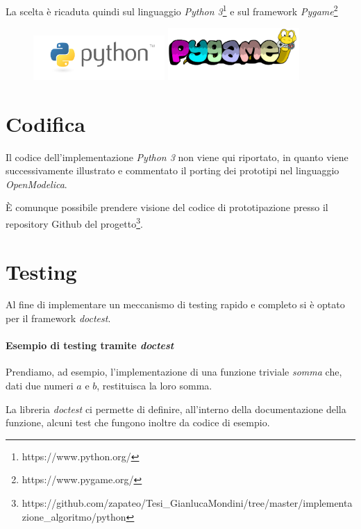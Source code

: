 \documentclass[11pt,a4paper]{report}
\begin{document}
La scelta è ricaduta quindi sul linguaggio \textit{Python 3}\footnote{https://www.python.org/} e sul framework \textit{Pygame}\footnote{https://www.pygame.org/}

\begin{figure}[H]
\centering
\includegraphics[width=5cm]{python.png}
\includegraphics[width=5cm]{pygame.png}

\end{figure}

\section{Codifica}

Il codice dell'implementazione \textit{Python 3} non viene qui riportato, in quanto viene successivamente illustrato e commentato il porting dei prototipi nel linguaggio \textit{OpenModelica}.

È comunque possibile prendere visione del codice di prototipazione presso il repository Github del progetto\footnote{https://github.com/zapateo/Tesi\_GianlucaMondini/tree/master/implementazione\_algoritmo/python}.


\section{Testing}

Al fine di implementare un meccanismo di testing rapido e completo si è optato per il framework \textit{doctest}.

\paragraph{Esempio di testing tramite \textit{doctest}}

Prendiamo, ad esempio, l'implementazione di una funzione triviale \textit{somma} che, dati due numeri $a$ e $b$, restituisca la loro somma.

La libreria \textit{doctest} ci permette di definire, all'interno della documentazione della funzione, alcuni test che fungono inoltre da codice di esempio.
\end{document}
